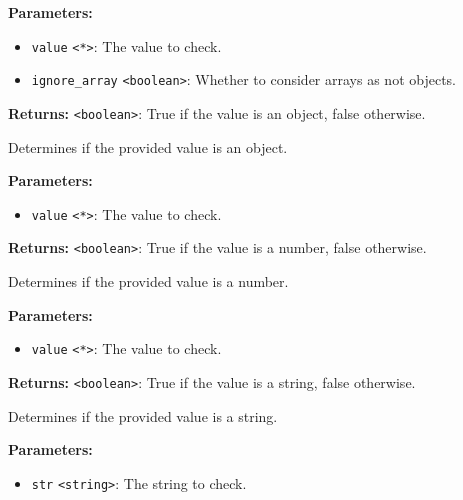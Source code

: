 \documentclass[12pt,a4paper]{article}
\begin{document}
\noindent \textbf{Parameters:}
\begin{itemize}
  \item \texttt{value} \texttt{<*>}: The value to check.
  \item \texttt{ignore\_array} \texttt{<boolean>}: Whether to consider arrays as not objects.
\end{itemize}

\noindent \textbf{Returns:} \texttt{<boolean>}: True if the value is an object, false otherwise.

\noindent Determines if the provided value is an object.

\vspace{5mm}
\noindent {}


\noindent \textbf{Parameters:}
\begin{itemize}
  \item \texttt{value} \texttt{<*>}: The value to check.
\end{itemize}

\noindent \textbf{Returns:} \texttt{<boolean>}: True if the value is a number, false otherwise.

\noindent Determines if the provided value is a number.

\vspace{5mm}
\noindent {}


\noindent \textbf{Parameters:}
\begin{itemize}
  \item \texttt{value} \texttt{<*>}: The value to check.
\end{itemize}

\noindent \textbf{Returns:} \texttt{<boolean>}: True if the value is a string, false otherwise.

\noindent Determines if the provided value is a string.

\vspace{5mm}
\noindent {}


\noindent \textbf{Parameters:}
\begin{itemize}
  \item \texttt{str} \texttt{<string>}: The string to check.
\end{itemize}
\end{document}
